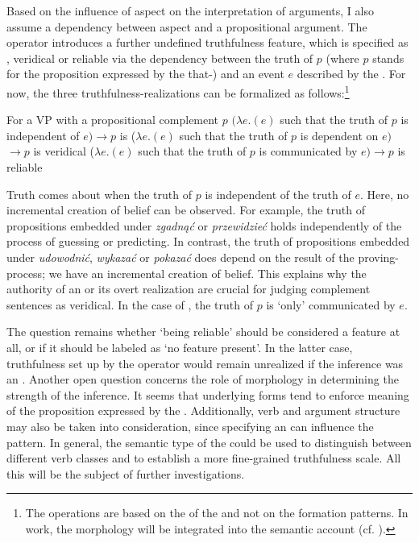 \documentclass[output=paper,  modfonts,  newtxmath,  hidelinks		  ]{langscibook}
\begin{document}
Based on the influence of aspect on the interpretation of  arguments, I also assume a dependency between aspect and a propositional argument. The  operator  introduces a further undefined truthfulness feature, which is specified as , veridical or reliable via the dependency between the truth of $p$ (where $p$ stands for the proposition expressed by the that-) and an event $e$ described by the . For now, the three truthfulness-realizations can be formalized as follows:\footnote{The operations are based on the  of the  and not on the formation patterns. In  work, the morphology will be integrated into the semantic account (cf. \citealt{Młynarczyk2004}).}

  
\ea For a VP with a propositional complement $p$
\ea {}\hspace{1pt}$(\lambda e.$$(e)$ such that the truth of $p$ is independent of $e)$\newline$\rightarrow p$ is 
\ex {}\hspace{1pt}($\lambda e.$$(e)$ such that the truth of $p$ is dependent on $e)$\newline$\rightarrow p$ is veridical
\ex {}\hspace{1pt}($\lambda e.$$(e)$ such that the truth of $p$ is communicated by $e)$\newline$\rightarrow p$ is reliable
\z
\z



\noindent Truth  comes about when the truth of $p$ is independent of the truth of $e$. Here, no incremental creation of belief can be observed. For example, the truth of propositions embedded under \textit{zgadnąć} or \textit{przewidzieć} holds independently of the process of guessing or predicting. In contrast, the truth of propositions embedded under \textit{udowodnić}, \textit{wykazać} or \textit{pokazać} does depend on the result of the proving-process; we have an incremental creation of belief. This explains why the authority of an  or its overt realization are crucial for judging complement sentences as veridical. In the case of , the truth of $p$ is ‘only’ communicated by $e$.

The question remains whether ‘being reliable’ should be considered a feature at all, or if it should be labeled as ‘no feature present’. In the latter case, truthfulness set up by the  operator would remain unrealized if the inference was an . Another open question concerns the role of morphology in determining the strength of the inference. It seems that  underlying forms tend to enforce  meaning of the proposition expressed by the . Additionally, verb  and argument structure may also be taken into consideration, since specifying an  can influence the  pattern. In general, the semantic type of the  could be used to distinguish between different verb classes and to establish a more fine-grained truthfulness scale. All this will be the subject of further investigations.
\end{document}
